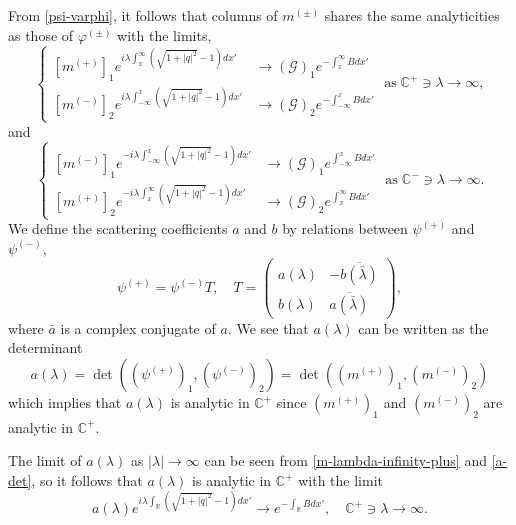 \documentclass[11pt]{article}
\newcommand{\RR}{{\mathbb R}}
\newcommand{\CC}{{\mathbb C}}
\begin{document}
From \eqref{psi-varphi}, it follows that columns of $m^{(\pm)}$ shares the same analyticities as those of $\varphi^{(\pm)}$ with the limits,
\begin{equation} \label{m-lambda-infinity-plus}
\left\{\begin{matrix}
[m^{(+)}]_1e^{i\lambda \int_x^{\infty}(\sqrt{1+|q|^2}-1)dx'} &\rightarrow (\mathcal{G})_1 e^{-\int_x^{\infty}Bdx'}\\
[m^{(-)}]_2e^{i\lambda \int_{-\infty}^x(\sqrt{1+|q|^2}-1)dx'} &\rightarrow (\mathcal{G})_2 e^{-\int_{-\infty}^xBdx'}
\end{matrix}\right. \;\mbox{as}\; \CC^+\ni \lambda \rightarrow \infty,
\end{equation}
and 
\begin{equation} \label{m-lambda-infinity-minus}
\left\{\begin{matrix}
[m^{(-)}]_1e^{-i\lambda \int_{-\infty}^x(\sqrt{1+|q|^2}-1)dx'} &\rightarrow (\mathcal{G})_1 e^{\int_{-\infty}^xBdx'}\\
[m^{(+)}]_2e^{-i\lambda \int^{\infty}_x(\sqrt{1+|q|^2}-1)dx'} &\rightarrow (\mathcal{G})_2 e^{\int^{\infty}_xBdx'}
\end{matrix}\right. \;\mbox{as}\; \CC^-\ni \lambda \rightarrow \infty.
\end{equation}
 We define the scattering coefficients $a$ and $b$ by relations between $\psi^{(+)}$ and $\psi^{(-)}$,%
\begin{equation} \label{def-T}
\psi^{(+)}=\psi^{(-)}T, \quad T =\begin{pmatrix} a(\lambda) & -\overline{b(\bar{\lambda})} \\ b(\lambda) & \overline{a(\bar{\lambda})} \end{pmatrix}, 
\end{equation}
where $\bar{a}$ is a complex conjugate of $a$.
We see that $a(\lambda)$ can be written as the determinant 
\begin{equation}\label{a-det}
a(\lambda)=\det((\psi^{(+)})_1,(\psi^{(-)})_2)=\det((m^{(+)})_1,(m^{(-)})_2)
\end{equation}
which implies that $a(\lambda)$ is analytic in $\CC^+$ since $(m^{(+)})_1$ and $(m^{(-)})_2$ are analytic in $\CC^+$.

The limit of $a(\lambda)$ as $|\lambda|\rightarrow \infty$ can be seen from \eqref{m-lambda-infinity-plus} and \eqref{a-det}, so it follows that $a(\lambda)$ is analytic in $\CC^+$ with the limit
\begin{equation}\label{a-limit}
a(\lambda)e^{i\lambda \int_{\RR} (\sqrt{1+|q|^2}-1)dx'} \rightarrow e^{- \int_{\RR}Bdx'}, \quad \CC^+\ni \lambda \rightarrow \infty.
\end{equation}
\end{document}
